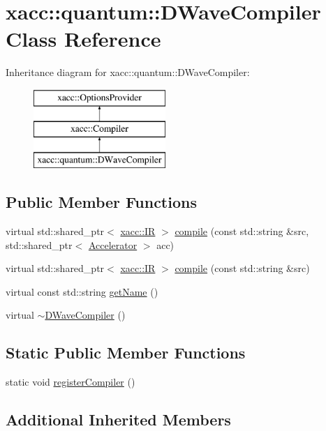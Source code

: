 \hypertarget{a00080}{}\section{xacc\+:\+:quantum\+:\+:D\+Wave\+Compiler Class Reference}
\label{a00080}
Inheritance diagram for xacc\+:\+:quantum\+:\+:D\+Wave\+Compiler\+:\begin{figure}[H]
\begin{center}
\leavevmode
\includegraphics[height=3.000000cm]{a00080}
\end{center}
\end{figure}
\subsection*{Public Member Functions}
\begin{DoxyCompactItemize}
\item 
virtual std\+::shared\+\_\+ptr$<$ \hyperlink{a00167}{xacc\+::\+IR} $>$ \hyperlink{a00080_a0f7f6b10b4a881cb27b36eaa6d39e7b1}{compile} (const std\+::string \&src, std\+::shared\+\_\+ptr$<$ \hyperlink{a00030}{Accelerator} $>$ acc)
\item 
virtual std\+::shared\+\_\+ptr$<$ \hyperlink{a00167}{xacc\+::\+IR} $>$ \hyperlink{a00080_a893e1d1c81a8aaf6e2435c9bceab575e}{compile} (const std\+::string \&src)
\item 
virtual const std\+::string \hyperlink{a00080_a8a180031ae563e1a9aac611e8066c181}{get\+Name} ()
\item 
virtual \hyperlink{a00080_acc0ab28f787b8f4cbeb63c594a247e50}{$\sim$\+D\+Wave\+Compiler} ()
\end{DoxyCompactItemize}
\subsection*{Static Public Member Functions}
\begin{DoxyCompactItemize}
\item 
static void \hyperlink{a00080_a5b221649f22a9bb4d4a304a6522d071f}{register\+Compiler} ()
\end{DoxyCompactItemize}
\subsection*{Additional Inherited Members}


